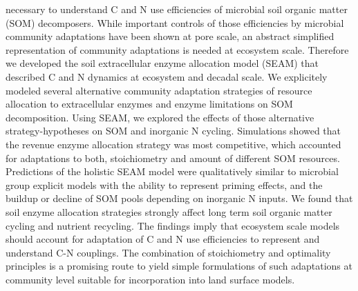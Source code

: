 necessary to understand C and N use efficiencies of microbial soil organic
matter (SOM) decomposers. While important controls of those efficiencies by
microbial community adaptations have been shown at pore scale, an abstract
simplified representation of community adaptations is needed at ecosystem scale.
Therefore we developed the soil extracellular enzyme allocation model (SEAM)
that described C and N dynamics at ecosystem and decadal scale.
We explicitely modeled several alternative community adaptation strategies of
resource allocation to extracellular enzymes and enzyme limitations on SOM
decomposition. Using SEAM, we explored the effects of those alternative
strategy-hypotheses on SOM and inorganic N cycling.
Simulations showed that the revenue enzyme allocation strategy was most
competitive, which accounted for adaptations to both, stoichiometry and amount
of different SOM resources.
Predictions of the holistic SEAM model were qualitatively similar to microbial
group explicit models with the ability to represent priming effects, and the
buildup or decline of SOM pools depending on inorganic N inputs.
We found that soil enzyme allocation strategies strongly affect long term soil
organic matter cycling and nutrient recycling.
The findings imply that ecosystem scale models should account for adaptation of
C and N use efficiencies to represent and understand C-N couplings. The
combination of stoichiometry and optimality principles is a promising route to
yield simple formulations of such adaptations at community level suitable for
incorporation into land surface models.
